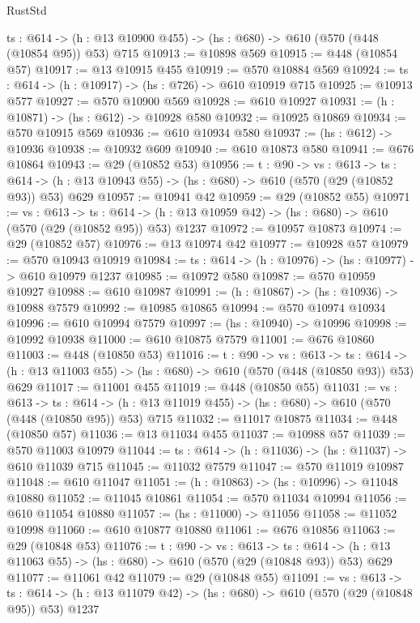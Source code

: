 \begin{lexlean}{RustStd}
\begin{coremodule}
  {ts : @614} -> (h : @13 @10900 @455) -> (hs : @680) -> @610 (@570 (@448 (@10854 @95)) @53) @715
@10913 := @10898 @569
@10915 := @448 (@10854 @57)
@10917 := @13 @10915 @455
@10919 := @570 @10884 @569
@10924 := {ts : @614} -> (h : @10917) -> (hs : @726) -> @610 @10919 @715
@10925 := @10913 @577
@10927 := @570 @10900 @569
@10928 := @610 @10927
@10931 := (h : @10871) -> (hs : @612) -> @10928 @580
@10932 := @10925 @10869
@10934 := @570 @10915 @569
@10936 := @610 @10934 @580
@10937 := (hs : @612) -> @10936
@10938 := @10932 @609
@10940 := @610 @10873 @580
@10941 := @676 @10864
@10943 := @29 (@10852 @53)
@10956 := {t : @90} ->
  {vs : @613} ->
  {ts : @614} -> (h : @13 @10943 @55) -> (hs : @680) -> @610 (@570 (@29 (@10852 @93)) @53) @629
@10957 := @10941 @42
@10959 := @29 (@10852 @55)
@10971 := {vs : @613} ->
  {ts : @614} -> (h : @13 @10959 @42) -> (hs : @680) -> @610 (@570 (@29 (@10852 @95)) @53) @1237
@10972 := @10957 @10873
@10974 := @29 (@10852 @57)
@10976 := @13 @10974 @42
@10977 := @10928 @57
@10979 := @570 @10943 @10919
@10984 := {ts : @614} -> (h : @10976) -> (hs : @10977) -> @610 @10979 @1237
@10985 := @10972 @580
@10987 := @570 @10959 @10927
@10988 := @610 @10987
@10991 := (h : @10867) -> (hs : @10936) -> @10988 @7579
@10992 := @10985 @10865
@10994 := @570 @10974 @10934
@10996 := @610 @10994 @7579
@10997 := (hs : @10940) -> @10996
@10998 := @10992 @10938
@11000 := @610 @10875 @7579
@11001 := @676 @10860
@11003 := @448 (@10850 @53)
@11016 := {t : @90} ->
  {vs : @613} ->
  {ts : @614} -> (h : @13 @11003 @55) -> (hs : @680) -> @610 (@570 (@448 (@10850 @93)) @53) @629
@11017 := @11001 @455
@11019 := @448 (@10850 @55)
@11031 := {vs : @613} ->
  {ts : @614} -> (h : @13 @11019 @455) -> (hs : @680) -> @610 (@570 (@448 (@10850 @95)) @53) @715
@11032 := @11017 @10875
@11034 := @448 (@10850 @57)
@11036 := @13 @11034 @455
@11037 := @10988 @57
@11039 := @570 @11003 @10979
@11044 := {ts : @614} -> (h : @11036) -> (hs : @11037) -> @610 @11039 @715
@11045 := @11032 @7579
@11047 := @570 @11019 @10987
@11048 := @610 @11047
@11051 := (h : @10863) -> (hs : @10996) -> @11048 @10880
@11052 := @11045 @10861
@11054 := @570 @11034 @10994
@11056 := @610 @11054 @10880
@11057 := (hs : @11000) -> @11056
@11058 := @11052 @10998
@11060 := @610 @10877 @10880
@11061 := @676 @10856
@11063 := @29 (@10848 @53)
@11076 := {t : @90} ->
  {vs : @613} ->
  {ts : @614} -> (h : @13 @11063 @55) -> (hs : @680) -> @610 (@570 (@29 (@10848 @93)) @53) @629
@11077 := @11061 @42
@11079 := @29 (@10848 @55)
@11091 := {vs : @613} ->
  {ts : @614} -> (h : @13 @11079 @42) -> (hs : @680) -> @610 (@570 (@29 (@10848 @95)) @53) @1237

\end{coremodule}
\end{lexlean}
